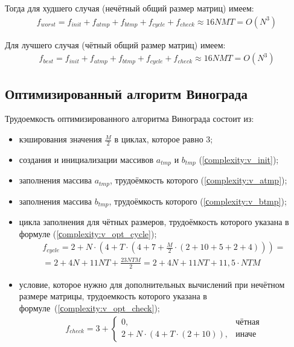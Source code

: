 Тогда для худшего случая (нечётный общий размер матриц) имеем:
\begin{equation}
	\label{сomplexity:vinograd_worst}
	\begin{gathered}
		f_{worst} = f_{init} + f_{atmp} + f_{btmp} + f_{cycle} + f_{check} \approx 16NMT = O(N^3)
	\end{gathered}
\end{equation}

Для лучшего случая (чётный общий размер матриц) имеем:
\begin{equation}
	\label{сomplexity:vinograd_best}
	\begin{gathered}
		f_{best} = f_{init} + f_{atmp} + f_{btmp} + f_{cycle} + f_{check} \approx 16NMT = O(N^3)
	\end{gathered}
\end{equation}

\subsection{Оптимизированный алгоритм Винограда}

Трудоемкость оптимизированного алгоритма Винограда состоит из:
\begin{itemize}[label=---]
	\item кэширования значения $\frac{M}{2}$ в циклах, которое равно 3;
	\item создания и инициализации массивов $a_{tmp}$ и $b_{tmp}$ (\ref{сomplexity:v_init});
	\item заполнения массива $a_{tmp}$, трудоёмкость которого (\ref{сomplexity:v_atmp});
	\item заполнения массива $b_{tmp}$, трудоёмкость которого (\ref{сomplexity:v_btmp});
	\item цикла заполнения для чётных размеров, трудоёмкость которого указана в формуле (\ref{сomplexity:v_opt_cycle});
	\begin{equation}
		\label{сomplexity:v_opt_cycle}
		\begin{aligned}
			f_{cycle} = 2 + N \cdot (4 + T \cdot (4 + 7 + \frac{M}{2} \cdot (2 + 10 + 5 + 2 + 4))) = \\
			= 2 + 4N + 11NT + \frac{23NTM}{2}  = 2 + 4N + 11NT + 11,5 \cdot NTM 
		\end{aligned}
	\end{equation}
	\item условие, которое нужно для дополнительных вычислений при нечётном размере матрицы, трудоемкость которого указана в формуле~(\ref{сomplexity:v_opt_check});
	\begin{equation}
		\label{сomplexity:v_opt_check}
		\begin{aligned}
			f_{check} = 3 + 
			\begin{cases}
				0, & \text{чётная} \\
				2 + N \cdot (4 + T \cdot (2 + 10)), & \text{иначе}
			\end{cases}
		\end{aligned}  
	\end{equation}
\end{itemize}

